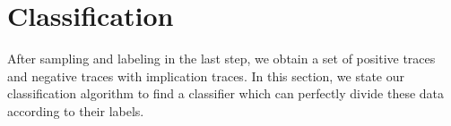 
\section{Classification} %
\label{sec:classification}

After sampling and labeling in the last step, 
we obtain a set of positive traces and negative traces with implication traces. 
In this section, we state our classification algorithm to find a classifier 
which can perfectly divide these data according to their labels.

